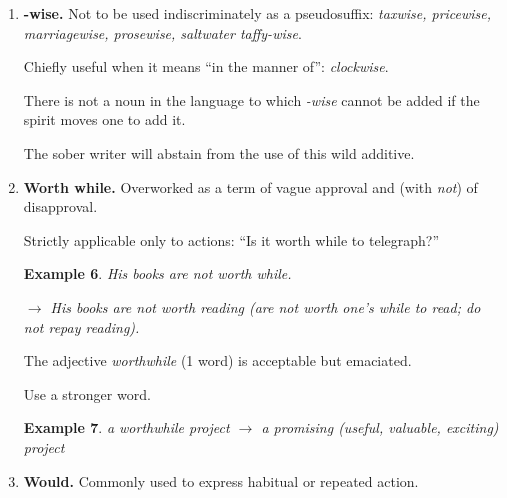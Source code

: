 \documentclass{article}
\newtheorem{example}{Example}
\begin{document}
\begin{enumerate}
\begin{example}
		$\to$ The office and salesrooms are on the ground floor; the rest of the building is used for manufacturing.
	\end{example}
	Its use as a virtual equivalent {\it of although} is allowable in sentences where this leads to no ambiguity or absurdity.
	\begin{example}
		While I admire his energy, I wish it were employed in a better cause.
	\end{example}
	This is entirely correct, as shown by the paraphrase
	\begin{example}
		I admire his energy; at the same time, I wish it were employed in a better cause.
	\end{example}
	Compare:
	\begin{example}
		While the temperature reaches 90 or 95 degrees in the daytime, the nights are often chilly.
	\end{example}
	The paraphrase shows why the use of {\it while} is incorrect:
	\begin{example}
		The temperature reaches 90 or 95 degrees in the daytime; at the same time the nights are often chilly.
	\end{example}
	In general, the writer will do well to use {\it while} only with strict literalness, in the sense of ``during the time that.''
	\item {\bf -wise.} Not to be used indiscriminately as a pseudosuffix: {\it taxwise, pricewise, marriagewise, prosewise, saltwater taffy-wise}.
	
	Chiefly useful when it means ``in the manner of'': {\it clockwise}.
	
	There is not a noun in the language to which {\it -wise} cannot be added if the spirit moves one to add it.
	
	The sober writer will abstain from the use of this wild additive.
	\item {\bf Worth while.} Overworked as a term of vague approval and (with {\it not}) of disapproval.
	
	Strictly applicable only to actions: ``Is it worth while to telegraph?''
	\begin{example}
		His books are not worth while.
		
		$\to$ His books are not worth reading (are not worth one's while to read; do not repay reading).
	\end{example}
	The adjective {\it worthwhile} (1 word) is acceptable but emaciated.
	
	Use a stronger word.
	\begin{example}
		a worthwhile project $\to$ a promising (useful, valuable, exciting) project
	\end{example}
	\item {\bf Would.} Commonly used to express habitual or repeated action.
	

\end{enumerate}
\end{document}
